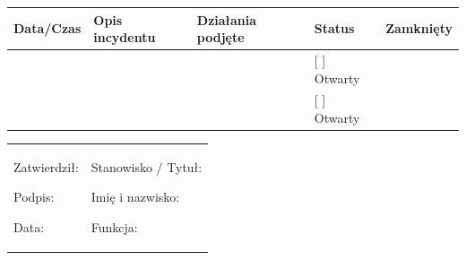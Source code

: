 \documentclass[12pt,a4paper]{article}
\begin{document}
\begin{longtable}[]{@{}>{\raggedright\arraybackslash}p{}>{\raggedright\arraybackslash}p{}>{\raggedright\arraybackslash}p{}>{\raggedright\arraybackslash}p{}>{\raggedright\arraybackslash}p{}@{}}
\toprule\noalign{}
Data/Czas & Opis incydentu & Działania podjęte & Status & Zamknięty \\
\midrule\noalign{}
\endhead
\bottomrule\noalign{}
\endlastfoot
\underline{\hspace{2cm}} &
\underline{\hspace{4cm}} &
\underline{\hspace{4cm}} & {[} {]} Otwarty &
\underline{\hspace{2cm}} \\
\underline{\hspace{2cm}} &
\underline{\hspace{4cm}} &
\underline{\hspace{4cm}} & {[} {]} Otwarty &
\underline{\hspace{2cm}} \\
\end{longtable}

\begin{longtable}[]{@{}
  >{\raggedright\arraybackslash}p{}
  >{\raggedright\arraybackslash}p{}@{}}
\toprule\noalign{}
\endhead
\bottomrule\noalign{}
\endlastfoot
\begin{minipage}[t]{\linewidth}\raggedright
Zatwierdził:

Podpis: \underline{\hspace{3cm}}

Data: \underline{\hspace{4cm}}
\end{minipage} & \begin{minipage}[t]{\linewidth}\raggedright
Stanowisko / Tytuł:

Imię i nazwisko: \underline{\hspace{3cm}}

Funkcja: \underline{\hspace{3cm}}
\end{minipage} \\
\end{longtable}
\end{document}
